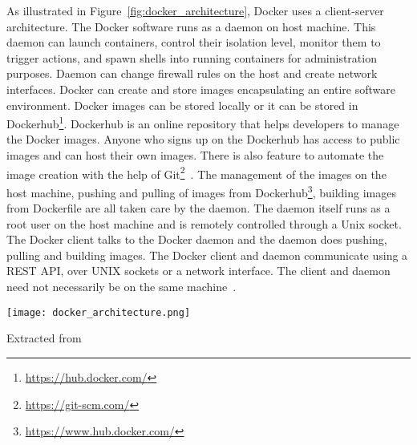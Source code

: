 As illustrated in Figure~\ref{fig:docker_architecture}, Docker uses a 
client-server architecture. The Docker software runs as a daemon on 
host machine. This daemon can launch containers, control their 
isolation level, monitor them to trigger actions, and spawn shells into 
running containers for administration purposes. Daemon can change 
firewall rules on the host and create network interfaces. Docker can 
create and store images encapsulating an entire software environment. 
Docker images can be stored locally or it can be stored in 
Dockerhub\footnote{\url{https://hub.docker.com/}}. Dockerhub is an 
online repository that helps developers to manage the Docker images. 
Anyone who signs up on the Dockerhub has access to public images and 
can host their own images. There is also feature to automate 
the image creation with the help of 
Git\footnote{\url{https://git-scm.com/}}~\cite{7742298}. The management of the images on 
the host machine, pushing and pulling of images from 
Dockerhub\footnote{\url{https://www.hub.docker.com/}}, building images 
from Dockerfile are all taken care by the daemon. The daemon itself 
runs as a root user on the host machine and is remotely controlled 
through a Unix socket. The Docker client talks to the Docker daemon and 
the daemon does pushing, pulling and 
building images. The Docker client and daemon communicate using a REST 
API, over UNIX sockets or a network interface. The client and daemon 
need not necessarily be on the same 
machine~\cite{docker-documentation}.

\begin{center}
\texttt{[image: docker\_architecture.png]}
\label{fig:docker_architecture}
\caption*{Extracted from \cite{docker-documentation}}
\end{center}


